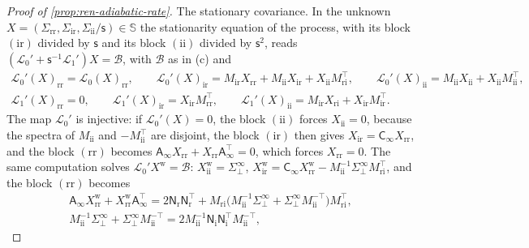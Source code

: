 \begin{proof}[Proof of \cref{prop:ren-adiabatic-rate}]
The stationary covariance. In the unknown $X=(\Sigma_{\mathrm{rr}},\Sigma_{\mathrm{ir}},\Sigma_{\mathrm{ii}}/\mathsf s)\in\mathbb S$ the stationarity equation of the process, with its block $(\mathrm{ir})$ divided by $\mathsf s$ and its block $(\mathrm{ii})$ divided by $\mathsf s^2$, reads $(\mathcal L_0'+\mathsf s^{-1}\mathcal L_1')X=\mathcal B$, with $\mathcal B$ as in (c) and
\[
\begin{gathered}
\mathcal L_0'(X)_{\mathrm{rr}}=\mathcal L_0(X)_{\mathrm{rr}},\qquad\mathcal L_0'(X)_{\mathrm{ir}}=M_{\mathrm{ir}}X_{\mathrm{rr}}+M_{\mathrm{ii}}X_{\mathrm{ir}}+X_{\mathrm{ii}}M_{\mathrm{ri}}^\top,\qquad\mathcal L_0'(X)_{\mathrm{ii}}=M_{\mathrm{ii}}X_{\mathrm{ii}}+X_{\mathrm{ii}}M_{\mathrm{ii}}^\top,\\
\mathcal L_1'(X)_{\mathrm{rr}}=0,\qquad\mathcal L_1'(X)_{\mathrm{ir}}=X_{\mathrm{ir}}M_{\mathrm{rr}}^\top,\qquad\mathcal L_1'(X)_{\mathrm{ii}}=M_{\mathrm{ir}}X_{\mathrm{ri}}+X_{\mathrm{ir}}M_{\mathrm{ir}}^\top.
\end{gathered}
\]
The map $\mathcal L_0'$ is injective: if $\mathcal L_0'(X)=0$, the block $(\mathrm{ii})$ forces $X_{\mathrm{ii}}=0$, because the spectra of $M_{\mathrm{ii}}$ and $-M_{\mathrm{ii}}^\top$ are disjoint, the block $(\mathrm{ir})$ then gives $X_{\mathrm{ir}}=\mathsf C_\infty X_{\mathrm{rr}}$, and the block $(\mathrm{rr})$ becomes $\mathsf A_\infty X_{\mathrm{rr}}+X_{\mathrm{rr}}\mathsf A_\infty^\top=0$, which forces $X_{\mathrm{rr}}=0$. The same computation solves $\mathcal L_0'X^{\mathrm w}=\mathcal B$: $X^{\mathrm w}_{\mathrm{ii}}=\Sigma^\infty_\perp$, $X^{\mathrm w}_{\mathrm{ir}}=\mathsf C_\infty X^{\mathrm w}_{\mathrm{rr}}-M_{\mathrm{ii}}^{-1}\Sigma^\infty_\perp M_{\mathrm{ri}}^\top$, and the block $(\mathrm{rr})$ becomes
\[
\begin{gathered}
\mathsf A_\infty X^{\mathrm w}_{\mathrm{rr}}+X^{\mathrm w}_{\mathrm{rr}}\mathsf A_\infty^\top=2\mathsf N_{\mathrm r}\mathsf N_{\mathrm r}^\top+M_{\mathrm{ri}}\bigl(M_{\mathrm{ii}}^{-1}\Sigma^\infty_\perp+\Sigma^\infty_\perp M_{\mathrm{ii}}^{-\top}\bigr)M_{\mathrm{ri}}^\top,\\
M_{\mathrm{ii}}^{-1}\Sigma^\infty_\perp+\Sigma^\infty_\perp M_{\mathrm{ii}}^{-\top}=2M_{\mathrm{ii}}^{-1}\mathsf N_{\mathrm i}\mathsf N_{\mathrm i}^\top M_{\mathrm{ii}}^{-\top},
\end{gathered}
\]

\end{proof}

